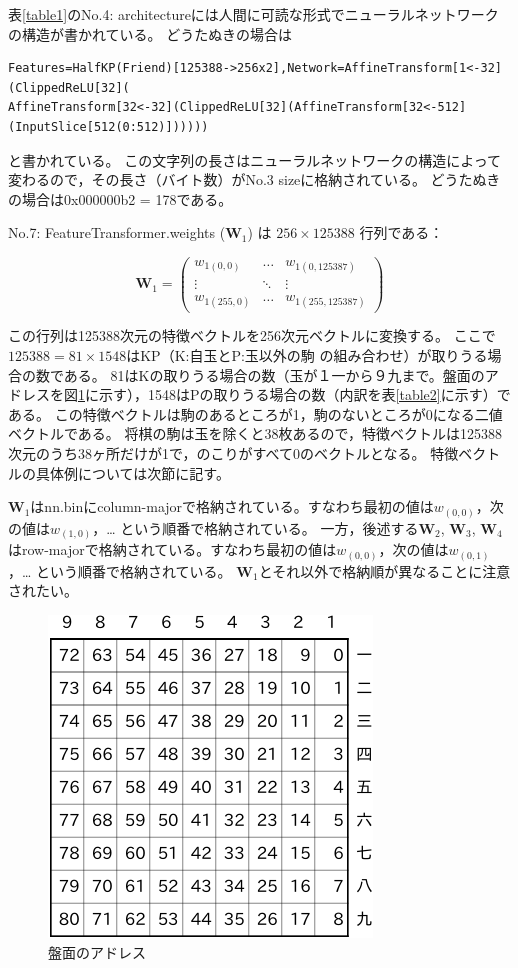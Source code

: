 \documentclass[11pt,a4paper]{ltjsarticle}
\begin{document}
表\ref{table1}のNo.4: architectureには人間に可読な形式でニューラルネットワークの構造が書かれている。
どうたぬきの場合は

{
\small
\begin{verbatim}
Features=HalfKP(Friend)[125388->256x2],Network=AffineTransform[1<-32](ClippedReLU[32](
AffineTransform[32<-32](ClippedReLU[32](AffineTransform[32<-512](InputSlice[512(0:512)])))))
\end{verbatim}
}

\noindent
と書かれている。
この文字列の長さはニューラルネットワークの構造によって変わるので，その長さ（バイト数）がNo.3 sizeに格納されている。
どうたぬきの場合は0x000000b2 = 178である。

No.7: FeatureTransformer.weights ($\bm{W}_1$) は $256 \times 125388$ 行列である：

\[
  \bm{W}_1 =
  \left(
    \begin{array}{ccc}
      w_{1(0,0)}   & \ldots & w_{1(0,125387)} \\
      \vdots    & \ddots & \vdots \\
      w_{1(255,0)} & \ldots & w_{1(255,125387)}
    \end{array}
  \right)
\]

\noindent
この行列は125388次元の特徴ベクトルを256次元ベクトルに変換する。
ここで$125388 = 81 \times 1548$はKP（K:自玉とP:玉以外の駒 の組み合わせ）が取りうる場合の数である。
81はKの取りうる場合の数（玉が１一から９九まで。盤面のアドレスを図\ref{fig1}に示す），1548はPの取りうる場合の数（内訳を表\ref{table2}に示す）である。
この特徴ベクトルは駒のあるところが1，駒のないところが0になる二値ベクトルである。
将棋の駒は玉を除くと38枚あるので，特徴ベクトルは125388次元のうち38ヶ所だけが1で，のこりがすべて0のベクトルとなる。
特徴ベクトルの具体例については次節に記す。

$\bm{W}_1$はnn.binにcolumn-majorで格納されている。すなわち最初の値は$w_{(0,0)}$，次の値は$w_{(1,0)}$，… という順番で格納されている。
一方，後述する$\bm{W}_2$, $\bm{W}_3$, $\bm{W}_4$はrow-majorで格納されている。すなわち最初の値は$w_{(0,0)}$，次の値は$w_{(0,1)}$，… という順番で格納されている。
$\bm{W}_1$とそれ以外で格納順が異なることに注意されたい。

\begin{figure}
  \centering
  \includegraphics{fig/fig1.pdf}
  \caption{盤面のアドレス}
  \label{fig1}
\end{figure}
\end{document}
